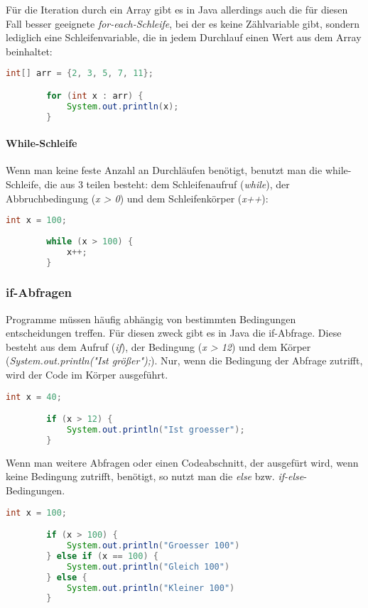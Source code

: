 \documentclass{article}
\begin{document}
	Für die Iteration durch ein Array gibt es in Java allerdings auch die für diesen Fall besser geeignete \textit{for-each-Schleife}, bei der es keine Zählvariable gibt, sondern lediglich eine Schleifenvariable, die in jedem Durchlauf einen Wert aus dem Array beinhaltet:

	\begin{lstlisting}[language=Java, caption=Iteration durch ein Array mit einer for-each-Schleife] 
		int[] arr = {2, 3, 5, 7, 11};

		for (int x : arr) {
			System.out.println(x);
		}	
	\end{lstlisting}

	\paragraph{While-Schleife}
	Wenn man keine feste Anzahl an Durchläufen benötigt, benutzt man die while-Schleife, die aus 3 teilen besteht: dem Schleifenaufruf (\textit{while}), der Abbruchbedingung (\textit{x > 0}) und dem Schleifenkörper (\textit{x++}):


	\begin{lstlisting}[language=Java, caption=Eine einfache while-Schleife]
		int x = 100;
		
		while (x > 100) {
			x++;
		}
	\end{lstlisting}

	\subsubsection{if-Abfragen}
	Programme müssen häufig abhängig von bestimmten Bedingungen entscheidungen treffen. Für diesen zweck gibt es in Java die if-Abfrage. Diese besteht aus dem Aufruf (\textit{if}), der Bedingung (\textit{x > 12}) und dem Körper (\textit{System.out.println("Ist größer");}). Nur, wenn die Bedingung der Abfrage zutrifft, wird der Code im Körper ausgeführt.

	\begin{lstlisting}[language=Java, caption=Eine einfache if-Abfrage]
		int x = 40;

		if (x > 12) {
			System.out.println("Ist groesser");
		}
	\end{lstlisting}

	Wenn man weitere Abfragen oder einen Codeabschnitt, der ausgefürt wird, wenn keine Bedingung zutrifft, benötigt, so nutzt man die \textit{else} bzw. \textit{if-else}-Bedingungen.

	\begin{lstlisting}[language=Java, caption=Eine einfache if-else-Kette]
		int x = 100;

		if (x > 100) {
			System.out.println("Groesser 100")
		} else if (x == 100) {
			System.out.println("Gleich 100")
		} else {
			System.out.println("Kleiner 100")
		}
	\end{lstlisting}
\end{document}
